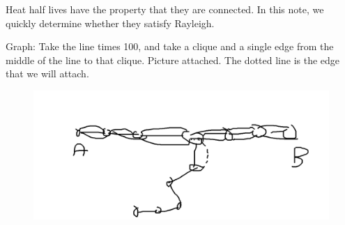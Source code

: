 Heat half lives have the property that they are connected. In
this note, we quickly determine whether they satisfy Rayleigh.

Graph: Take the line times 100, and take a clique and a single
edge from the middle of the line to that clique. Picture
attached. The dotted line is the edge that we will attach.

\begin{figure}[h]
  \begin{center}
    \includegraphics[width= 6in]{bad-heat-graph.png}
  \end{center}
  \caption{}
    \label{fig:bad-graph}
\end{figure}

